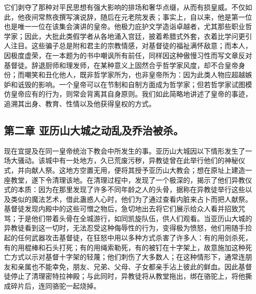 它们剥夺了那种对平民思想有强大影响的排场和奢华点缀，从而有损皇威。不仅如此，他夜间常熬夜撰写演说辞，随后在元老院发表；事实上，自以来，他是第一位也是唯一一位在该集会演讲的皇帝。他极力庇护文学造诣卓越者，尤其那些职业哲学家；因此，大批此类假学者从各地涌入宫廷，披着希腊式外套，衣着比学问更引人注目。这些骗子总是附和君主的宗教情感，对基督徒的福祉满怀敌意；而本人，因极度虚荣，在一本题为的书中嘲讽所有前任，同样因这种傲慢习性而写文章反对基督徒。辞退厨师和理发师，在某种意义上固然合乎哲学家风度，却不合皇帝身份；而嘲笑和丑化他人，既非哲学家所为，也非皇帝所为：因为此类人物应超越嫉妒和诋毁的影响。一个皇帝可以在节制和自制方面成为哲学家；但若哲学家试图模仿皇帝应有的行为，则常会背离其自身原则。我们如此简略地讲述了皇帝的事迹，追溯其出身、教育、性情以及他获得皇权的方式。\par


\subsection{第二章 亚历山大城之动乱及乔治被杀。}

现在宜提及在同一皇帝统治下教会中所发生的事。亚历山大城因以下情形发生了一场大骚动。该城中有一处地方，久已荒废污秽，异教徒曾在此举行他们的神秘仪式，并向献人祭。这地方空置无用，便将其授予亚历山大教会；想在原址上建造一座教堂，遂下令清理该地。在清理过程中，发现了一个极深的，揭示了他们异教仪式的本质：因为在那里发现了许多不同年龄之人的头骨，据称在异教徒举行这些以及类似的魔法艺术，借此蛊惑人心时，他们为了通过查看内脏来占卜而把人献祭。基督徒发现内殿中的这些可憎之物后，急切地出去将它们展示给众人看并招致咒骂；于是他们带着头骨在全城游行，如同凯旋队伍，供人们观看。当亚历山大城的异教徒看到这一切时，无法忍受这种侮辱性的行为，变得极为愤怒，他们用随手捡起的任何武器攻击基督徒，在狂怒中用以多种方式杀害了许多人：有的用剑杀死，有的用棍棒和石头打死；有的用绳索勒死，有的被钉在十字架上，故意施加这种死亡方式以示对基督十字架的轻蔑；他们刺伤了大多数人；在这种情形下，通常连朋友和亲属也不能幸免，朋友、兄弟、父母、子女都亲手沾上彼此的鲜血。因此基督徒停止了清理密特拉神殿；与此同时，异教徒将从教堂拖出，绑在骆驼上，将他撕成碎片后，连同骆驼一起烧掉。\par


